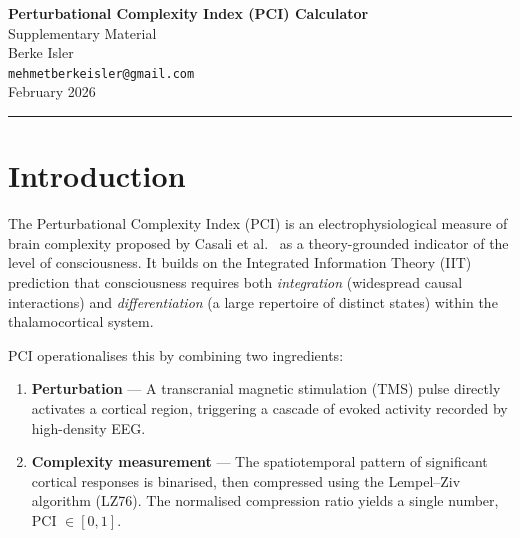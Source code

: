 \documentclass[11pt,a4paper]{article}
\begin{document}
\begin{center}
  {\LARGE\bfseries Perturbational Complexity Index (PCI) Calculator}\\[6pt]
  {\Large Supplementary Material}\\[12pt]
  {\large Berke Isler}\\[4pt]
  {\small\texttt{mehmetberkeisler@gmail.com}}\\[6pt]
  {\small February 2026}\\[4pt]
  \rule{0.6\textwidth}{0.4pt}
\end{center}

\vspace{6pt}

\begin{abstract}
\noindent
This document provides supplementary material for the Perturbational Complexity Index (PCI) Calculator software.
It describes the theoretical background behind PCI, the complete mathematical formulation of the algorithm as
proposed by Casali et al.\ (2013), the implementation details of our Python-based processing pipeline, the
corrections and improvements applied during code review, and a formal description of the \emph{istisna}
exception-handling mode for mislabelled trigger markers. A TikZ-rendered flowchart of the full algorithm
is provided along with pseudocode for all core routines.
\end{abstract}

\tableofcontents
\newpage

\section{Introduction}
\label{sec:intro}

The Perturbational Complexity Index (PCI) is an electrophysiological measure of brain complexity
proposed by Casali et al.\ \cite{casali2013} as a theory-grounded indicator of the level of
consciousness. It builds on the Integrated Information Theory (IIT) prediction that consciousness
requires both \emph{integration} (widespread causal interactions) and \emph{differentiation}
(a large repertoire of distinct states) within the thalamocortical system.

PCI operationalises this by combining two ingredients:

\begin{enumerate}[leftmargin=2em]
  \item \textbf{Perturbation} --- A transcranial magnetic stimulation (TMS) pulse directly
        activates a cortical region, triggering a cascade of evoked activity recorded by
        high-density EEG.
  \item \textbf{Complexity measurement} --- The spatiotemporal pattern of significant cortical
        responses is binarised, then compressed using the Lempel--Ziv algorithm (LZ76). The
        normalised compression ratio yields a single number, PCI $\in [0, 1]$.
\end{enumerate}
\end{document}
